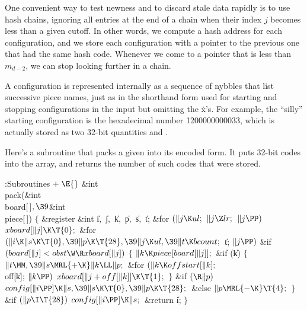 One convenient way to test newness and to discard stale data rapidly
is to use hash chains, ignoring all entries at the end of a chain
when their index $j$ becomes less than a given cutoff.
In other words, we compute a hash address for each configuration,
and we store each configuration with a pointer to the previous one
that had the same hash code. Whenever we come to a pointer that is
less than $m_{d-2}$, we can stop looking further in a chain.

\fi

A configuration is represented internally as a sequence of
nybbles
that list successive piece names, just as in the shorthand form
used for starting and stopping configurations in the input but
omitting the \.x's. For example, the ``silly'' starting configuration
is the hexadecimal number \.{1200000000033}, which is actually
stored as two 32-bit quantities  and .

Here's a subroutine that packs a given  into its encoded form.
It puts 32-bit codes into the  array, and returns the
number of such codes that were stored.

\Y\B\4:Subroutines\X${}\mathrel+\E{}$\6
\&{int} \\{pack}(\&{int} \\{board}[\,]${},\39{}$\&{int} \\{piece}[\,])\1\1\2\2\6
${}\{{}$\1\6
\&{register} \&{int} \|i${},{}$ \|j${},{}$ \|k${},{}$ \|p${},{}$ \|s${},{}$ %
\|t;\7
\&{for} ${}(\|j\K\\{ul};{}$ ${}\|j\Z\\{lr};{}$ ${}\|j\PP){}$\1\5
${}\\{xboard}[\|j]\K\T{0};{}$\2\6
\&{for} ${}(\|i\K\|s\K\T{0},\39\|p\K\T{28},\39\|j\K\\{ul},\39\|t\K%
\\{bcount};{}$ \|t; ${}\|j\PP){}$\1\6
\&{if} ${}(\\{board}[\|j]<\\{obst}\W\R\\{xboard}[\|j]){}$\5
${}\{{}$\1\6
${}\|k\K\\{piece}[\\{board}[\|j]];{}$\6
\&{if} (\|k)\5
${}\{{}$\1\6
${}\|t\MM,\39\|s\MRL{+{\K}}\|k\LL\|p;{}$\6
\&{for} ${}(\|k\K\\{offstart}[\|k];{}$ \\{off}[\|k]; ${}\|k\PP){}$\1\5
${}\\{xboard}[\|j+\\{off}[\|k]]\K\T{1};{}$\2\6
\4${}\}{}$\2\6
\&{if} ${}(\R\|p){}$\1\5
${}\\{config}[\|i\PP]\K\|s,\39\|s\K\T{0},\39\|p\K\T{28};{}$\2\6
\&{else}\1\5
${}\|p\MRL{-{\K}}\T{4};{}$\2\6
\4${}\}{}$\2\2\6
\&{if} ${}(\|p\I\T{28}){}$\1\5
${}\\{config}[\|i\PP]\K\|s;{}$\2\6
\&{return} \|i;\6
\4${}\}{}$\2\par
\fi

